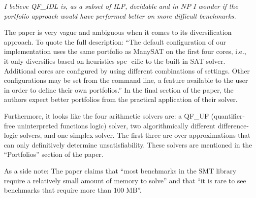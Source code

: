 \documentclass{scrartcl}
\begin{document}
\textit{I believe QF\_IDL is, as a subset of ILP, decidable and in \(NP\)
I wonder if the portfolio approach would have performed better on more difficult
benchmarks.}

The paper is very vague and ambiguous when it comes to its diversification approach.
To quote the full description:
\enquote{The default conﬁguration of our implementation uses the same portfolio as
ManySAT on the ﬁrst four cores, i.e., it only diversiﬁes based on heuristics spe-
ciﬁc to the built-in SAT-solver. Additional cores are conﬁgured by using diﬀerent
combinations of settings. Other conﬁgurations may be set from the command
line, a feature available to the user in order to deﬁne their own portfolios.}
In the final section of the paper, the authors expect better portfolios
from the practical application of their solver.

Furthermore, it looks like the four arithmetic solvers are:
a QF\_UF (quantifier-free uninterpreted functions logic) solver,
two algorithmically different difference-logic solvers,
and one simplex solver.
The first three are over-approximations that can only definitively determine unsatisfiability.
These solvers are mentioned in the \enquote{Portfolios} section of the paper.

As a side note:
The paper claims that
\enquote{most benchmarks in the SMT library require a relatively small amount of memory to solve}
and that \enquote{it is rare to see benchmarks that require more than 100 MB}.
\end{document}
